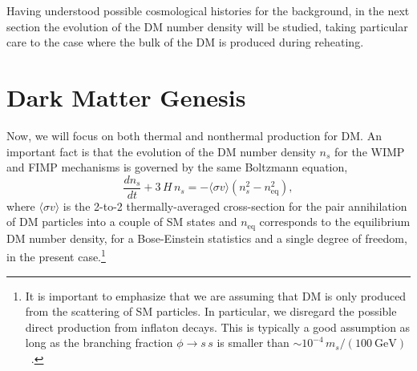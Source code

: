 \documentclass[a4paper,11pt]{article}
\newcommand{\mdm}{m_s}
\newcommand{\sv}{\langle\sigma v\rangle}
\begin{document}
Having understood possible cosmological histories for the background, in the next section the evolution of the DM number density will be studied, taking particular care to the case where the bulk of the DM is produced during reheating.

\section{Dark Matter Genesis}
\label{sec:DM_density}
Now, we will focus on both thermal and nonthermal production for DM.
An important fact is that the evolution of the DM number density $n_s$ for the WIMP and FIMP mechanisms is governed by the same Boltzmann equation,
\begin{equation} \label{eq:boltzdm}
    \dfrac{dn_s}{dt} + 3\, H\, n_s = - \sv \left(n_s^2 - n_\text{eq}^2\right),
\end{equation}
where $\sv$ is the 2-to-2 thermally-averaged cross-section for the pair annihilation of DM particles into a couple of SM states and $n_\text{eq}$ corresponds to the equilibrium DM number density, for a Bose-Einstein statistics and a single degree of freedom, in the present case.\footnote{It is important to emphasize that we are assuming that DM is only produced from the scattering of SM particles. In particular, we disregard the possible direct production from inflaton decays. This is typically a good assumption as long as the branching fraction $\phi \to s\, s$ is smaller than $\sim 10^{-4}\, \mdm/(100~\text{GeV})$~\cite{Drees:2017iod, Arias:2019uol}.}
\end{document}
